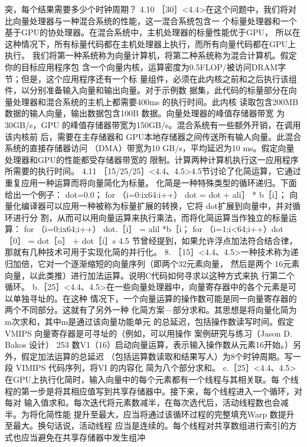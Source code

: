 突，每个结果需要多少个时钟周期？
4.10
［30］<4.4>在这个问题中，我们将对比向量处理器与一种混合系统的性能，这一混合系统包含一
个标量处理器和一个基于GPU的协处理器。在混合系统中，主机处理器的标量性能优于GPU，
所以在这种情况下，所有标量代码都在主机处理器上执行，而所有向量代码都在GPU上执行。
我们将第一种系统称为向量计算机，将第二种系统称为混合计算机。假定你的目标应用程序包
含一个向量内核，运算密度为0.5FLOP/被访问DRAM字节；但是，这个应用程序还有一个标
量组件，必须在此内核之前和之后执行该组件，以分别准备输入向量和输出向量。对于示例数
据集，此代码的标量部分在向量处理器和混合系统的主机上都需要400ms 的执行时间。此内核
读取包含200MB 数据的输人向量，输出数据包含100B 数据。向量处理器的峰值存储器带宽
为30GB/s，GPU 的峰值存储器带宽为150GB/s。混合系统有一些额外开销，在调用该内核前
后，需要在主存储器和 GPU本地存储器之间传送所有输人向量。此混合系统的直接存储器访问
（DMA）带宽为10 GB/s，平均延迟为10 ms。假定向量处理器和GPU的性能都受存储器带宽的
限制。计算两种计算机执行这一应用程序所需要的执行时间。
4.11
［15/25/25］<4.4、4.5>4.5节讨论了化简运算，它通过重复应用一种运算而将向量简化为标量。
化简是一种特殊类型的循环递归。下面给出一个例子：
dot=0.0；
for （i=0:ix64:i++） dot = dot + ali］ * b［i］；
向量化编译器可以应用一种被称为标量扩展的转换，它将 dot扩展到向量中，并对循环进行分
割，从而可以用向量运算来执行乘法，而将化简运算当作独立的标量运算：
for （i=0;ix64;i++） dot.［i］ = alil *b［i；
for （i=1;i<64;i++）dot［0］ = dot［o］ + dot［i］s
4.5 节曾经提到，如果允许浮点加法符合结合律，那就有几种技术可用于实现化简的并行化。
8. ［15］<4.4、4.5>一种技术称为递归加倍，它对一个逐渐缩短的向量序列（即两个32元素向量，
然后是两个 16元素向量，以此类推）进行加法运算。说明C代码如何寻求以这种方式来执
行第二个循环。
b.［25］<4.4、4.5>在一些向量处理器中，向量寄存器中的各个元素是可以单独寻址的。在这种
情况下，一个向量运算的操作数可能是同一向量寄存器的两个不同部分。这就有了另外一种
化简方案—部分求和。其思想是将向量化简为 m次求和，其中m是通过该向量功能单元
的总延迟，包括操作数读写时间。假定 VMIPS 向量寄存器是可寻址的（例如，可以用操作
案例研究与练习（Jason D. Bakos 设计）
253
数V1（16）启动向量运算，表示输入操作数从元素16开始。）另外，假定加法运算的总延迟
（包括运算数读取和结果写人）为8个时钟周期。写一段 VIMIPS 代码序列，将VI 的内容化
简为八个部分求和。
c.［25］<4.4、4.5>在GPU上执行化简时，输入向量中的每个元素都有一个线程与其相关联。每
个线程的第一步是将其相应值写到共享存储器中。接下来，每个线程进入一个循环，对每对
输入值求和。每次迭代将元素数减半，在每次选代后，活动线程数也会减半。为将化简性能
提升至最大，应当将通过该循环过程的完整填充Warp 数提升至最大。换句话说，活动线程
应当是连续的。每个线程对共享数组进行索引的方式也应当避免在共享存储器中发生组冲
